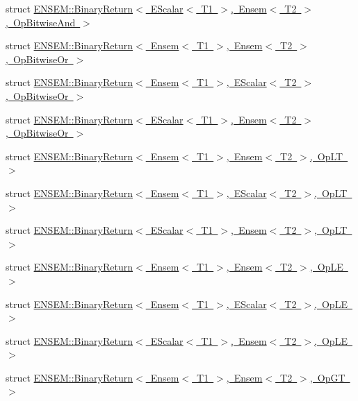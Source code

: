 \begin{DoxyCompactItemize}
struct \mbox{\hyperlink{structENSEM_1_1BinaryReturn_3_01EScalar_3_01T1_01_4_00_01Ensem_3_01T2_01_4_00_01OpBitwiseAnd_01_4}{E\+N\+S\+E\+M\+::\+Binary\+Return$<$ E\+Scalar$<$ T1 $>$, Ensem$<$ T2 $>$, Op\+Bitwise\+And $>$}}
\item 
struct \mbox{\hyperlink{structENSEM_1_1BinaryReturn_3_01Ensem_3_01T1_01_4_00_01Ensem_3_01T2_01_4_00_01OpBitwiseOr_01_4}{E\+N\+S\+E\+M\+::\+Binary\+Return$<$ Ensem$<$ T1 $>$, Ensem$<$ T2 $>$, Op\+Bitwise\+Or $>$}}
\item 
struct \mbox{\hyperlink{structENSEM_1_1BinaryReturn_3_01Ensem_3_01T1_01_4_00_01EScalar_3_01T2_01_4_00_01OpBitwiseOr_01_4}{E\+N\+S\+E\+M\+::\+Binary\+Return$<$ Ensem$<$ T1 $>$, E\+Scalar$<$ T2 $>$, Op\+Bitwise\+Or $>$}}
\item 
struct \mbox{\hyperlink{structENSEM_1_1BinaryReturn_3_01EScalar_3_01T1_01_4_00_01Ensem_3_01T2_01_4_00_01OpBitwiseOr_01_4}{E\+N\+S\+E\+M\+::\+Binary\+Return$<$ E\+Scalar$<$ T1 $>$, Ensem$<$ T2 $>$, Op\+Bitwise\+Or $>$}}
\item 
struct \mbox{\hyperlink{structENSEM_1_1BinaryReturn_3_01Ensem_3_01T1_01_4_00_01Ensem_3_01T2_01_4_00_01OpLT_01_4}{E\+N\+S\+E\+M\+::\+Binary\+Return$<$ Ensem$<$ T1 $>$, Ensem$<$ T2 $>$, Op\+L\+T $>$}}
\item 
struct \mbox{\hyperlink{structENSEM_1_1BinaryReturn_3_01Ensem_3_01T1_01_4_00_01EScalar_3_01T2_01_4_00_01OpLT_01_4}{E\+N\+S\+E\+M\+::\+Binary\+Return$<$ Ensem$<$ T1 $>$, E\+Scalar$<$ T2 $>$, Op\+L\+T $>$}}
\item 
struct \mbox{\hyperlink{structENSEM_1_1BinaryReturn_3_01EScalar_3_01T1_01_4_00_01Ensem_3_01T2_01_4_00_01OpLT_01_4}{E\+N\+S\+E\+M\+::\+Binary\+Return$<$ E\+Scalar$<$ T1 $>$, Ensem$<$ T2 $>$, Op\+L\+T $>$}}
\item 
struct \mbox{\hyperlink{structENSEM_1_1BinaryReturn_3_01Ensem_3_01T1_01_4_00_01Ensem_3_01T2_01_4_00_01OpLE_01_4}{E\+N\+S\+E\+M\+::\+Binary\+Return$<$ Ensem$<$ T1 $>$, Ensem$<$ T2 $>$, Op\+L\+E $>$}}
\item 
struct \mbox{\hyperlink{structENSEM_1_1BinaryReturn_3_01Ensem_3_01T1_01_4_00_01EScalar_3_01T2_01_4_00_01OpLE_01_4}{E\+N\+S\+E\+M\+::\+Binary\+Return$<$ Ensem$<$ T1 $>$, E\+Scalar$<$ T2 $>$, Op\+L\+E $>$}}
\item 
struct \mbox{\hyperlink{structENSEM_1_1BinaryReturn_3_01EScalar_3_01T1_01_4_00_01Ensem_3_01T2_01_4_00_01OpLE_01_4}{E\+N\+S\+E\+M\+::\+Binary\+Return$<$ E\+Scalar$<$ T1 $>$, Ensem$<$ T2 $>$, Op\+L\+E $>$}}
\item 
struct \mbox{\hyperlink{structENSEM_1_1BinaryReturn_3_01Ensem_3_01T1_01_4_00_01Ensem_3_01T2_01_4_00_01OpGT_01_4}{E\+N\+S\+E\+M\+::\+Binary\+Return$<$ Ensem$<$ T1 $>$, Ensem$<$ T2 $>$, Op\+G\+T $>$}}

\end{DoxyCompactItemize}
